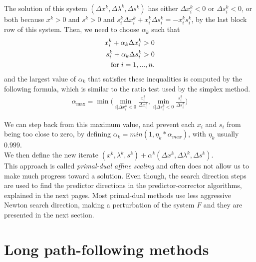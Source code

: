 \documentclass[a4paper,10 pt,titlepage,twoside]{book}
\theoremstyle{plain}
\theoremstyle{definition}
\theoremstyle{remark}
\begin{document}
The solution of this system $\left(\Delta x^{k},\Delta\lambda^{k},\Delta s^{k}\right)$ has either $\Delta x_{i}^{k}<0$ or $\Delta s_{i}^{k}<0$, or both because $x^{k}>0$ and $s^{k}>0$ and $s^{k}_{i}\Delta x^{k}_{i} + x^{k}_{i}\Delta s^{k}_{i} = - x^{k}_{i}s^{k}_{i}$, by the last block row of this system.
Then, we need to choose $\alpha_{k}$ such that
\begin{align*}
x^{k}_{i} + \alpha_{k} \Delta x^{k}_{i} >0 \\
s^{k}_{i} + \alpha_{k} \Delta s^{k}_{i} >0 \\	\text{for\;} i = 1,...,n.
\end{align*}
and the largest value of $\alpha_{k}$ that satisfies these inequalities is computed by the following formula, which is similar to the ratio test used by the simplex method. 
\begin{align*}
\alpha_{\max} = \min\bigg(\min_{i|\Delta x^{k}_{i}<0}\frac{x^{k}_{i}}{\Delta x^{k}_{i}}, \min_{i|\Delta s^{k}_{i}<0}\frac{s^{k}_{i}}{\Delta s^{k}_{i}}\bigg)
\end{align*} 

We can step back from this maximum value, and prevent each $x_{i}$ and $s_{i}$ from being too close to zero, by defining $\alpha_{k} = min\left(1,\eta_{k}*\alpha_{max}\right)$, with $\eta_{k}$ usually $0.999$.\\
We then define the new iterate $(x^{k},\lambda^{k},s^{k}) +\alpha^{k} (\Delta x^{k},\Delta \lambda^{k},\Delta s^{k})$.\\
This approach is called \textit{primal-dual affine scaling} and often does not allow us to make much progress toward a solution. Even though, the search direction steps are used to find the predictor directions in the predictor-corrector algorithms, explained in the next pages. 
Most primal-dual methods use less aggressive Newton search direction, making a perturbation of the system $F$ and they are presented in the next section.

\section{Long path-following methods}
\end{document}
